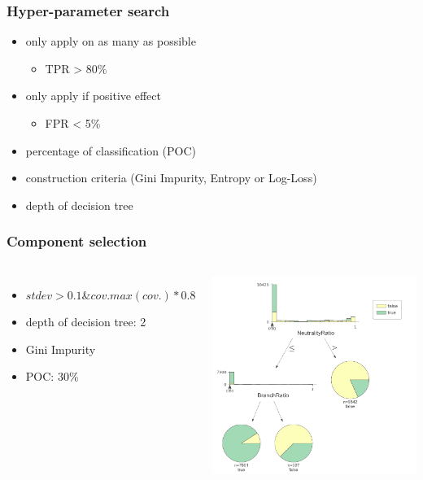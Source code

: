 \begin{frame}
	\frametitle{Hyper-parameter search}
	
	\begin{itemize}
		\item only apply on as many as possible
			\begin{itemize}
				\item TPR > 80\%
			\end{itemize}
		\item only apply if positive effect
			\begin{itemize}
				\item FPR < 5\%
			\end{itemize}
		\item percentage of classification (POC)
		\item construction criteria (Gini Impurity, Entropy or Log-Loss)
		\item depth of decision tree
	\end{itemize}
	
\end{frame}

\begin{frame}
	\frametitle{Component selection}
	
	\begin{columns}[c]
		
		
		\begin{itemize}
			\item $stdev > 0.1 \& cov. max(cov.) * 0.8$
			\item depth of decision tree: 2
			\item Gini Impurity
			\item POC: 30\%
		\end{itemize}
		
		\includegraphics[height=0.8\textheight]{figures/decision_tree}
		
	\end{columns}
	
	
\end{frame}
